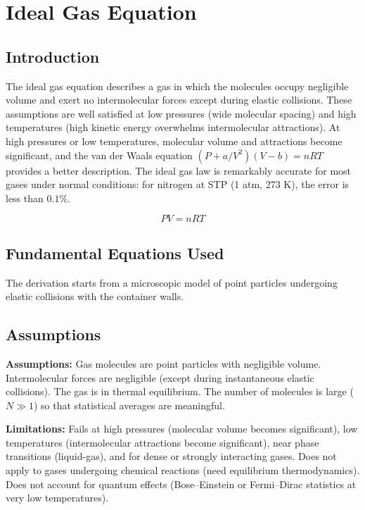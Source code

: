 \chapter{Ideal Gas Equation}

\section*{Introduction}

The ideal gas equation describes a gas in which the molecules occupy negligible volume and exert no intermolecular forces except during elastic collisions. These assumptions are well satisfied at low pressures (wide molecular spacing) and high temperatures (high kinetic energy overwhelms intermolecular attractions). At high pressures or low temperatures, molecular volume and attractions become significant, and the van der Waals equation $(P + a/V^2)(V - b) = nRT$ provides a better description. The ideal gas law is remarkably accurate for most gases under normal conditions: for nitrogen at STP (1 atm, 273 K), the error is less than $0.1\%$.


\[
PV=nRT
\]

\section*{Fundamental Equations Used}

The derivation starts from a microscopic model of point particles undergoing elastic collisions with the container walls.

\section*{Assumptions}

\textbf{Assumptions:} Gas molecules are point particles with negligible volume. Intermolecular forces are negligible (except during instantaneous elastic collisions). The gas is in thermal equilibrium. The number of molecules is large ($N \gg 1$) so that statistical averages are meaningful.


\textbf{Limitations:} Fails at high pressures (molecular volume becomes significant), low temperatures (intermolecular attractions become significant), near phase transitions (liquid-gas), and for dense or strongly interacting gases. Does not apply to gases undergoing chemical reactions (need equilibrium thermodynamics). Does not account for quantum effects (Bose--Einstein or Fermi--Dirac statistics at very low temperatures).



